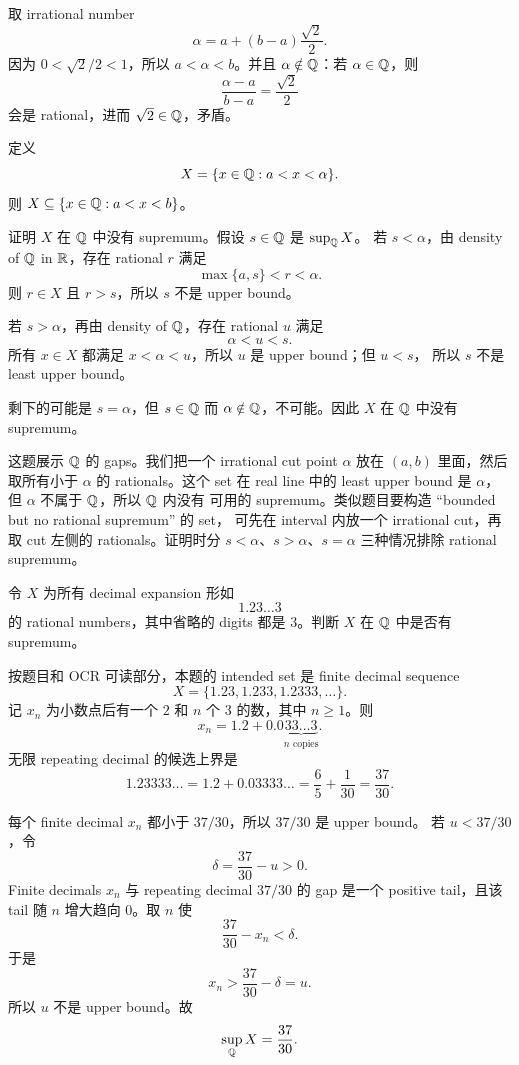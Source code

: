 \begin{solution}
取 irrational number
\[
  \alpha=a+(b-a)\frac{\sqrt2}{2}.
\]
因为 \(0<\sqrt2/2<1\)，所以 \(a<\alpha<b\)。并且 \(\alpha\notin\mathbb{Q}\)：若
\(\alpha\in\mathbb{Q}\)，则
\[
  \frac{\alpha-a}{b-a}=\frac{\sqrt2}{2}
\]
会是 rational，进而 \(\sqrt2\in\mathbb{Q}\)，矛盾。

定义
\[
  X=\{x\in\mathbb{Q}:a<x<\alpha\}.
\]
则 \(X\subseteq\{x\in\mathbb{Q}:a<x<b\}\)。

证明 \(X\) 在 \(\mathbb{Q}\) 中没有 supremum。假设 \(s\in\mathbb{Q}\) 是 \(\sup_{\mathbb{Q}}X\)。
若 \(s<\alpha\)，由 density of \(\mathbb{Q}\) in \(\mathbb{R}\)，存在 rational \(r\) 满足
\[
  \max\{a,s\}<r<\alpha.
\]
则 \(r\in X\) 且 \(r>s\)，所以 \(s\) 不是 upper bound。

若 \(s>\alpha\)，再由 density of \(\mathbb{Q}\)，存在 rational \(u\) 满足
\[
  \alpha<u<s.
\]
所有 \(x\in X\) 都满足 \(x<\alpha<u\)，所以 \(u\) 是 upper bound；但 \(u<s\)，
所以 \(s\) 不是 least upper bound。

剩下的可能是 \(s=\alpha\)，但 \(s\in\mathbb{Q}\) 而 \(\alpha\notin\mathbb{Q}\)，不可能。因此
\(X\) 在 \(\mathbb{Q}\) 中没有 supremum。
\end{solution}

\begin{explanation}
这题展示 \(\mathbb{Q}\) 的 gaps。我们把一个 irrational cut point \(\alpha\) 放在
\((a,b)\) 里面，然后取所有小于 \(\alpha\) 的 rationals。这个 set 在 real line 中的
least upper bound 是 \(\alpha\)，但 \(\alpha\) 不属于 \(\mathbb{Q}\)，所以 \(\mathbb{Q}\) 内没有
可用的 supremum。类似题目要构造 ``bounded but no rational supremum'' 的 set，
可先在 interval 内放一个 irrational cut，再取 cut 左侧的 rationals。证明时分
\(s<\alpha\)、\(s>\alpha\)、\(s=\alpha\) 三种情况排除 rational supremum。
\end{explanation}

\begin{exerciseblock}
令 \(X\) 为所有 decimal expansion 形如
\[
  1.23\ldots3
\]
的 rational numbers，其中省略的 digits 都是 \(3\)。判断 \(X\) 在 \(\mathbb{Q}\) 中是否有
supremum。
\end{exerciseblock}

\begin{solution}
按题目和 OCR 可读部分，本题的 intended set 是 finite decimal sequence
\[
  X=\{1.23,1.233,1.2333,\ldots\}.
\]
记 \(x_n\) 为小数点后有一个 \(2\) 和 \(n\) 个 \(3\) 的数，其中 \(n\geq1\)。则
\[
  x_n=1.2+0.0\underbrace{33\ldots3}_{n\text{ copies}}.
\]
无限 repeating decimal 的候选上界是
\[
  1.23333\ldots=1.2+0.03333\ldots=\frac65+\frac1{30}=\frac{37}{30}.
\]

每个 finite decimal \(x_n\) 都小于 \(37/30\)，所以 \(37/30\) 是 upper bound。
若 \(u<37/30\)，令
\[
  \delta=\frac{37}{30}-u>0.
\]
Finite decimals \(x_n\) 与 repeating decimal \(37/30\) 的 gap 是一个 positive
tail，且该 tail 随 \(n\) 增大趋向 \(0\)。取 \(n\) 使
\[
  \frac{37}{30}-x_n<\delta.
\]
于是
\[
  x_n>\frac{37}{30}-\delta=u.
\]
所以 \(u\) 不是 upper bound。故
\[
  \sup_{\mathbb{Q}}X=\frac{37}{30}.
\]
\end{solution}

